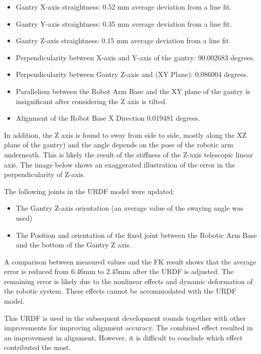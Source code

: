 \begin{itemize}
	\item Gantry X-axis straightness: 0.52 mm average deviation from a line fit.

	\item Gantry Y-axis straightness: 0.35 mm average deviation from a line fit.

	\item Gantry Z-axis straightness: 0.15 mm average deviation from a line fit.

	\item Perpendicularity between X-axis and Y-axis of the gantry: 90.002683 degrees.

	\item Perpendicularity between Gantry Z-axis and (XY Plane): 0.086004 degrees.

	\item Parallelism between the Robot Arm Base and the XY plane of the gantry is insignificant after considering the Z axis is tilted.

	\item Alignment of the Robot Base X Direction 0.019481 degrees.

\end{itemize}
In addition, the Z axis is found to sway from side to side, mostly along the XZ plane of the gantry) and the angle depends on the pose of the robotic arm underneath. This is likely the result of the stiffness of the Z-axis telescopic linear axis. The image below shows an exaggerated illustration of the error in the perpendicularity of Z-axis.




The following joints in the URDF model were updated:

\begin{itemize}
	\item The Gantry Z-axis orientation (an average value of the swaying angle was used)

	\item The Position and orientation of the fixed joint between the Robotic Arm Base and the bottom of the Gantry Z axis.

\end{itemize}
A comparison between measured values and the FK result shows that the average error is reduced from 6.46mm to 2.45mm after the URDF is adjusted. The remaining error is likely due to the nonlinear effects and dynamic deformation of the robotic system. These effects cannot be accommodated with the URDF model.

This URDF is used in the subsequent development rounds together with other improvements for improving alignment accuracy. The combined effect resulted in an improvement in alignment. However, it is difficult to conclude which effect contributed the most. 
